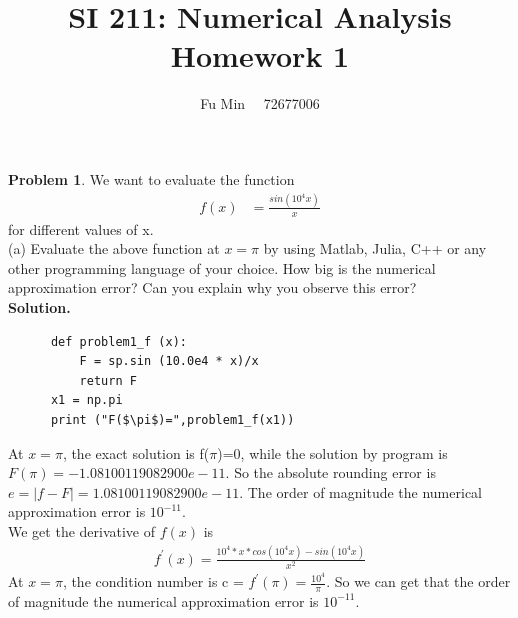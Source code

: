 \documentclass{article}
\author{Fu Min \ \ 72677006}
\title{SI 211: Numerical Analysis\\ Homework 1 }
\begin{document}
\maketitle
\noindent \textbf{Problem 1}. We want to evaluate the function
	 \begin{align*}
	 	f(x) & = \frac{sin(10^{4}x)}{x}  	  
	 \end{align*}
\indent for different values of x.\\
\indent (a) Evaluate the above function at $ x = \pi$ by using Matlab, Julia, C++ or any other programming language of your choice. How big is the numerical approximation error? Can you explain why you observe this error?\\
\indent \textbf{Solution.}
   \begin{lstlisting}
      def problem1_f (x):
          F = sp.sin (10.0e4 * x)/x
          return F
      x1 = np.pi
      print ("F($\pi$)=",problem1_f(x1))
    \end{lstlisting}
    
      \indent  At  $x=\pi$, the exact solution is  f($\pi$)=0, while the solution by program is  $F(\pi)=-1.08100119082900e-11$. So the absolute rounding error is  $e=|f-F|=1.08100119082900e-11$. The order of magnitude the numerical approximation error is $10^{-11}$.\\ 
      \indent We get the derivative of $f(x)$ is 
      \begin{align*}
         f^{'}(x) = \frac{10^{4}*x*cos(10^{4}x)-sin(10^{4}x)}{x^2}
      \end{align*}
      \indent  At  $x=\pi$, the condition number is c = $f^{'}(\pi) = \frac{10^{4}}{\pi}$. So we can get that the order of magnitude the numerical approximation error is $10^{-11}$. \\
      
\end{document}
